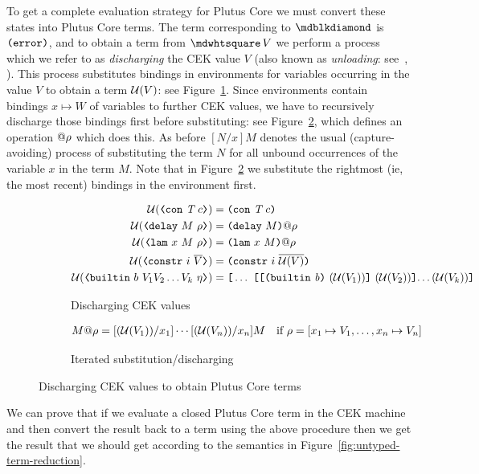 \noindent To get a complete evaluation strategy for Plutus Core we must convert
these states into Plutus Core terms.  The term corresponding to $\cekerror{}$ is
$\texttt{(} \texttt{error} \texttt{)}$, and to obtain a term from $\cekhalt{V}$ we perform a process which we
refer to as \textit{discharging} the CEK value $V$ (also known as
\textit{unloading}: see~\cite[pp. 129--130]{Plotkin-cbn-cbv},
\cite[pp. 71ff]{Felleisen-pllc}).  This process substitutes bindings in
environments for variables occurring in the value $V$ to obtain a term
$\mathcal{U}(V)$: see Figure~\ref{fig:discharge-val}.  Since environments contain
bindings $x \mapsto W$ of variables to further CEK values, we have to
recursively discharge those bindings first before substituting: see
Figure~\ref{fig:discharge-env}, which defines an operation ${}@{\rho}$ which
does this.  As before $[N/x]M$ denotes the usual (capture-avoiding) process of
substituting the term $N$ for all unbound occurrences of the variable $x$ in the
term $M$. Note that in Figure~\ref{fig:discharge-env} we substitute the
rightmost (ie, the most recent) bindings in the environment first.

\begin{figure}[H]
  \centering

  \begin{subfigure}[b]{\textwidth}
    \begin{align*}
      \unload{\VCon{\tn}{c}} &= \con{\tn}{c}\\
      \unload{\VDelay{M}{\rho}}
        &= \Unload{\rho}{\delay{M}}\\
      \unload{\VLamAbs{x}{M}{\rho}} &= \Unload{\rho}{\lamU{x}{M}}\\
      \unload{\VConstr{i}{\repetition{V}}} &= \constr{i}{\repetition{\unload{V}}}\\
      \unload{\VBuiltin{b}{V_1 V_2\ldots V_k}{\eta}} &=
      \appU{\ldots}  %
           {\appU
             {\appU
               {\builtin{b}}
               {(\unload{V_1})}
             }
             {(\unload{V_2})}
             {\ldots (\unload{V_k})}
           }
    \end{align*}
    \caption{Discharging CEK values}
    \label{fig:discharge-val}
  \end{subfigure}

  \begin{subfigure}[c]{\textwidth}
    \begin{align*}
      {M}@{\rho} &= [(\mathcal{U}(V_1))/x_1]\cdots[(\mathcal{U}(V_n))/x_n]M \quad
      \text{if $\rho = [x_1 \mapsto V_1, \ldots, x_n \mapsto V_n]$}
    \end{align*}
    \caption{Iterated substitution/discharging}
    \label{fig:discharge-env}
  \end{subfigure}

  \caption{Discharging CEK values to obtain Plutus Core terms}
  \label{fig:discharge-cek-val}
\end{figure}%
%

\noindent We can prove that if we evaluate a closed Plutus Core term in the CEK
machine and then convert the result back to a term using the above procedure
then we get the result that we should get according to the semantics in
Figure~\ref{fig:untyped-term-reduction}.
